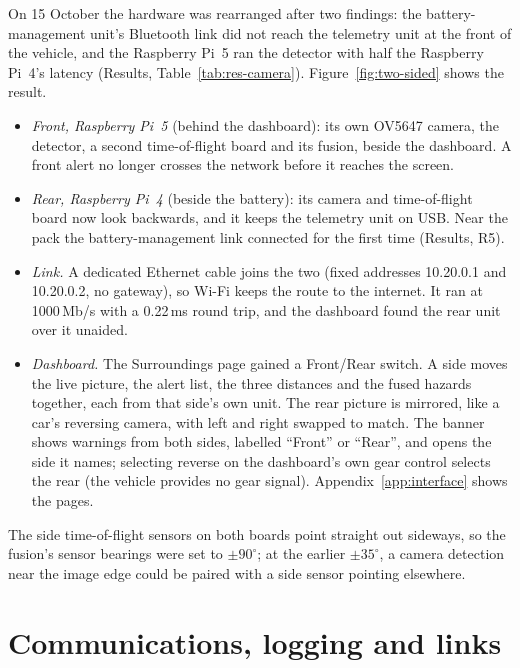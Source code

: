 On 15 October the hardware was rearranged after two findings: the battery-management unit's Bluetooth link did not reach the telemetry unit at the front of the vehicle, and the Raspberry Pi~5 ran the detector with half the Raspberry Pi~4's latency (Results, Table~\ref{tab:res-camera}). Figure~\ref{fig:two-sided} shows the result.

\begin{itemize}
\item \emph{Front, Raspberry Pi~5} (behind the dashboard): its own OV5647 camera, the detector, a second time-of-flight board and its fusion, beside the dashboard. A front alert no longer crosses the network before it reaches the screen.
\item \emph{Rear, Raspberry Pi~4} (beside the battery): its camera and time-of-flight board now look backwards, and it keeps the telemetry unit on USB. Near the pack the battery-management link connected for the first time (Results, R5).
\item \emph{Link.} A dedicated Ethernet cable joins the two (fixed addresses 10.20.0.1 and 10.20.0.2, no gateway), so Wi-Fi keeps the route to the internet. It ran at 1000\,Mb/s with a 0.22\,ms round trip, and the dashboard found the rear unit over it unaided.
\item \emph{Dashboard.} The Surroundings page gained a Front/Rear switch. A side moves the live picture, the alert list, the three distances and the fused hazards together, each from that side's own unit. The rear picture is mirrored, like a car's reversing camera, with left and right swapped to match. The banner shows warnings from both sides, labelled ``Front'' or ``Rear'', and opens the side it names; selecting reverse on the dashboard's own gear control selects the rear (the vehicle provides no gear signal). Appendix~\ref{app:interface} shows the pages.
\end{itemize}

The side time-of-flight sensors on both boards point straight out sideways, so the fusion's sensor bearings were set to $\pm 90^\circ$; at the earlier $\pm 35^\circ$, a camera detection near the image edge could be paired with a side sensor pointing elsewhere.

\section{Communications, logging and links}
\label{sec:impl-comms}

